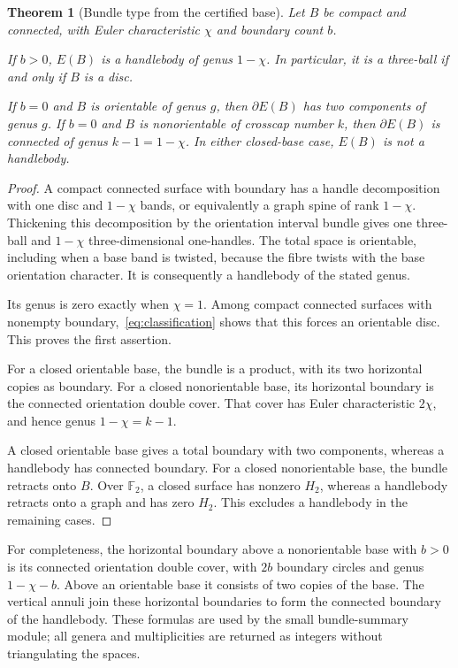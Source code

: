 \documentclass[11pt]{article}
\newtheorem{theorem}{Theorem}[section]
\theoremstyle{definition}
\theoremstyle{remark}\newtheorem{remark}[theorem]{Remark}
\newcommand{\F}{\mathbb F_2}
\begin{document}
\begin{theorem}[Bundle type from the certified base]\label{thm:bundle}
Let $B$ be compact and connected, with Euler characteristic $\chi$ and boundary count $b$.

If $b>0$, $E(B)$ is a handlebody of genus $1-\chi$. In particular, it is a three-ball if and only if $B$ is a disc.

If $b=0$ and $B$ is orientable of genus $g$, then $\partial E(B)$ has two components of genus $g$. If $b=0$ and $B$ is nonorientable of crosscap number $k$, then $\partial E(B)$ is connected of genus $k-1=1-\chi$. In either closed-base case, $E(B)$ is not a handlebody.
\end{theorem}
\begin{proof}
A compact connected surface with boundary has a handle decomposition with one disc and $1-\chi$ bands, or equivalently a graph spine of rank $1-\chi$. Thickening this decomposition by the orientation interval bundle gives one three-ball and $1-\chi$ three-dimensional one-handles. The total space is orientable, including when a base band is twisted, because the fibre twists with the base orientation character. It is consequently a handlebody of the stated genus.

Its genus is zero exactly when $\chi=1$. Among compact connected surfaces with nonempty boundary,~\eqref{eq:classification} shows that this forces an orientable disc. This proves the first assertion.

For a closed orientable base, the bundle is a product, with its two horizontal copies as boundary. For a closed nonorientable base, its horizontal boundary is the connected orientation double cover. That cover has Euler characteristic $2\chi$, and hence genus $1-\chi=k-1$.

A closed orientable base gives a total boundary with two components, whereas a handlebody has connected boundary. For a closed nonorientable base, the bundle retracts onto $B$. Over $\F$, a closed surface has nonzero $H_2$, whereas a handlebody retracts onto a graph and has zero $H_2$. This excludes a handlebody in the remaining cases.
\end{proof}

For completeness, the horizontal boundary above a nonorientable base with $b>0$ is its connected orientation double cover, with $2b$ boundary circles and genus $1-\chi-b$. Above an orientable base it consists of two copies of the base. The vertical annuli join these horizontal boundaries to form the connected boundary of the handlebody. These formulas are used by the small bundle-summary module; all genera and multiplicities are returned as integers without triangulating the spaces.
\end{document}
